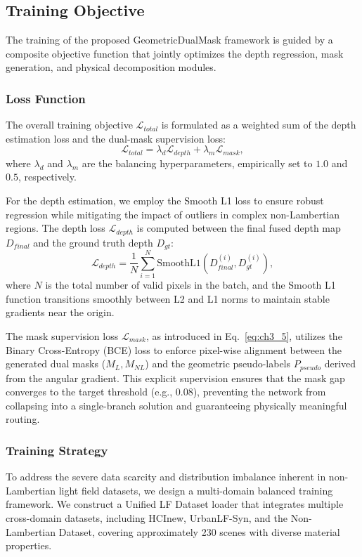 \subsection{Training Objective}

The training of the proposed GeometricDualMask framework is guided by a composite objective function that jointly optimizes the depth regression, mask generation, and physical decomposition modules. 

\subsubsection{Loss Function}
The overall training objective $\mathcal{L}_{total}$ is formulated as a weighted sum of the depth estimation loss and the dual-mask supervision loss:
\begin{equation}
    \mathcal{L}_{total} = \lambda_d \mathcal{L}_{depth} + \lambda_m \mathcal{L}_{mask},
    \label{eq:ch3_6}
\end{equation}
where $\lambda_d$ and $\lambda_m$ are the balancing hyperparameters, empirically set to $1.0$ and $0.5$, respectively. 

For the depth estimation, we employ the Smooth L1 loss to ensure robust regression while mitigating the impact of outliers in complex non-Lambertian regions. The depth loss $\mathcal{L}_{depth}$ is computed between the final fused depth map $D_{final}$ and the ground truth depth $D_{gt}$:
\begin{equation}
    \mathcal{L}_{depth} = \frac{1}{N} \sum_{i=1}^{N} \text{SmoothL1}(D_{final}^{(i)}, D_{gt}^{(i)}),
    \label{eq:ch3_7}
\end{equation}
where $N$ is the total number of valid pixels in the batch, and the Smooth L1 function transitions smoothly between L2 and L1 norms to maintain stable gradients near the origin.

The mask supervision loss $\mathcal{L}_{mask}$, as introduced in Eq.~\ref{eq:ch3_5}, utilizes the Binary Cross-Entropy (BCE) loss to enforce pixel-wise alignment between the generated dual masks ($M_L, M_{NL}$) and the geometric pseudo-labels $P_{pseudo}$ derived from the angular gradient. This explicit supervision ensures that the mask gap converges to the target threshold (e.g., $0.08$), preventing the network from collapsing into a single-branch solution and guaranteeing physically meaningful routing.

\subsubsection{Training Strategy}
To address the severe data scarcity and distribution imbalance inherent in non-Lambertian light field datasets, we design a multi-domain balanced training framework. We construct a Unified LF Dataset loader that integrates multiple cross-domain datasets, including HCInew, UrbanLF-Syn, and the Non-Lambertian Dataset, covering approximately 230 scenes with diverse material properties. 

